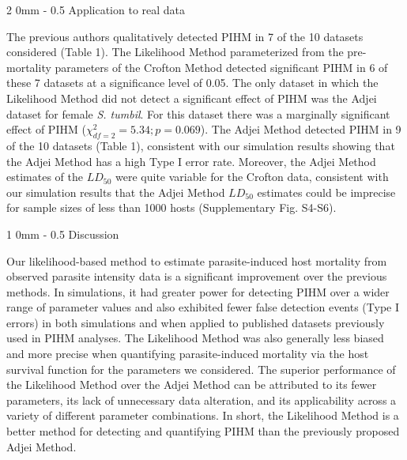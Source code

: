 \documentclass[12pt, a4paper]{article}
\makeatletter
\renewcommand{\section}{\@startsection
{section}%
{1}%
{0mm}%
{-\baselineskip}%
{0.5\baselineskip}%
{\normalfont\bf\large}} %
\renewcommand{\subsection}{\@startsection
{subsection}%
{2}%
{0mm}%
{-\baselineskip}%
{0.5\baselineskip}%
{\normalfont\bf}} %
\makeatother
\begin{document}
\subsection{Application to real data}

The previous authors qualitatively detected PIHM
in 7 of the 10 datasets considered (Table 1).  The Likelihood Method parameterized
from the pre-mortality parameters of the Crofton Method detected significant
PIHM in 6 of these 7 datasets at a significance level of 0.05.  The only
dataset in which the Likelihood Method did not detect a significant effect of PIHM was the Adjei dataset
for female \emph{S. tumbil}.  For this dataset there was a marginally significant effect
of PIHM ($\chi^2_{df=2} = 5.34; p = 0.069$). The Adjei Method detected PIHM in 9 of the 10 datasets (Table 1), consistent with our simulation results showing that the Adjei Method has a high Type I error rate.  Moreover, the Adjei Method estimates of the $LD_{50}$ were quite variable for the Crofton data, consistent with our simulation results that the Adjei Method $LD_{50}$ estimates could be imprecise for sample sizes of less than 1000 hosts (Supplementary Fig. S4-S6).

\section{Discussion}

Our likelihood-based method to estimate parasite-induced host mortality from
observed parasite intensity data is a significant improvement over the previous
methods.  In simulations, it had greater power for detecting PIHM over a wider
range of parameter values and also exhibited fewer false detection events (Type
I errors) in both simulations and when applied to published datasets previously
used in PIHM analyses. The Likelihood Method was also generally less biased and
more precise when quantifying parasite-induced mortality via the host survival
function for the parameters we considered.  The superior performance of the
Likelihood Method over the Adjei Method can be attributed to its fewer
parameters, its lack of unnecessary data alteration, and its applicability
across a variety of different parameter combinations. In short, the Likelihood
Method is a better method for detecting and quantifying PIHM than the
previously proposed Adjei Method.
\end{document}
